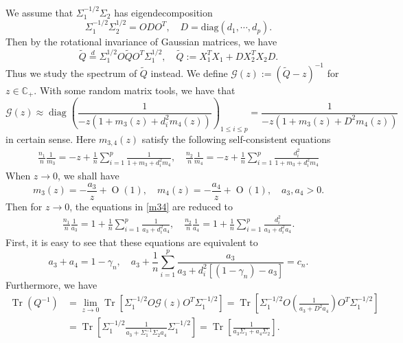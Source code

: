 \documentclass{article}
\numberwithin{equation}{section}
\newcommand{\1}{\mathds{1}}
\numberwithin{equation}{section}
\newcommand{\be}{\begin{equation}}
\newcommand{\ee}{\end{equation}}
\renewcommand{\cal}{\mathcal}
\newcommand{\wt}{\widetilde}
\renewcommand{\leq}{\leqslant}
\renewcommand{\le}{\leq}
\newcommand{\C}{\mathbb{C}}
\DeclareMathOperator{\diag}{diag}
\DeclareMathOperator{\tr}{Tr}
\DeclareMathOperator{\OO}{O}
\theoremstyle{plain} %
\theoremstyle{remark}
\newcommand{\cob}{\color{blue}}
\begin{document}
We assume that $ \Sigma_1^{-1/2}\Sigma_2$ has eigendecomposition
\be \nonumber %
\Sigma_1^{-1/2}\Sigma_2^{1/2} = ODO^T ,\quad D=\text{diag}(d_1, \cdots, d_p).
\ee
Then by the rotational invariance of Gaussian matrices, we have
$$\wt Q \overset{d}{=}\Sigma_1^{1/2} O \wt Q O^T \Sigma_1^{1/2},\quad \wt Q:=   X_1^T X_1  + D X_2^T X_2 D .$$
Thus we study the spectrum of $\wt Q$ instead. We define $\cal G(z):= (\wt Q-z)^{-1}$ for $z\in \C_+$. With some random matrix tools, we have that 
$$\cal G(z) \approx \diag\left( \frac{1}{-z\left( 1+ m_3(z) + d_i^2 m_4(z)\right)}\right)_{1\le i \le p}= \frac{1}{-z\left( 1+ m_3(z) + D^2 m_4(z)\right)} $$
{\cob in certain sense}. Here $m_{3,4}(z)$ satisfy the following self-consistent equations
\begin{align}\label{m34}
\frac{n_1}{n}\frac1{m_3} = - z +\frac1n\sum_{i=1}^p \frac1{  1+m_3 + d_i^2m_4  } ,\quad \frac{n_2}{n}\frac1{m_4} = - z +\frac1n\sum_{i=1}^p \frac{d_i^2 }{  1+m_3 + d_i^2m_4  } 
\end{align}
When $z\to 0$, we shall have
$$m_3(z)= - \frac{a_3}{z} + \OO(1), \quad m_4(z)= - \frac{a_4}{z} + \OO(1),\quad a_3,a_4>0.$$
Then for $z\to0$, the equations in \eqref{m34} are reduced to
\begin{align}\label{m34}
\frac{n_1}{n}\frac{1}{a_3} = 1 +\frac1n\sum_{i=1}^p \frac{1}{a_3 + d_i^2a_4  } ,\quad \frac{n_2}{n}\frac1{a_4} = 1 +\frac1n\sum_{i=1}^p \frac{d_i^2 }{  a_3 + d_i^2 a_4 }. 
\end{align}
First, it is easy to see that these equations are equivalent to
$$a_3 + a_4 = 1- \gamma_n, \quad a_3 +\frac1n\sum_{i=1}^p \frac{a_3}{a_3 + d_i^2[(1-\gamma_n)-a_3]  }=c_n  .$$
Furthermore, we have
\begin{align*}
\tr (Q^{-1}) &= \lim_{z\to 0}\tr \left[\Sigma_1^{-1/2} O \cal G(z)O^T \Sigma_1^{-1/2}\right]
=\tr \left[\Sigma_1^{-1/2} O  \left( \frac{1}{a_3 + D^2 a_4 }\right) O^T \Sigma_1^{-1/2}\right] \\
&=\tr \left[\Sigma_1^{-1/2}  \frac{1}{a_3+ \Sigma_1^{-1}\Sigma_2 a_4} \Sigma_1^{-1/2}\right]=\tr \left[ \frac{1}{a_3\Sigma_1 + a_4\Sigma_2 } \right].
\end{align*}
\end{document}
